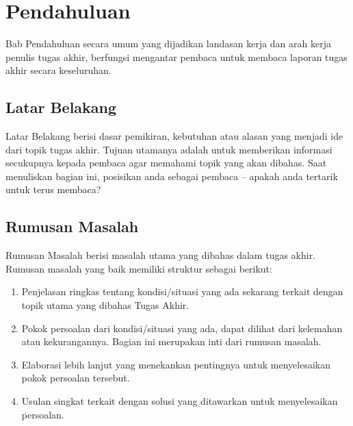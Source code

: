 %
%
%
%
%

\chapter{Pendahuluan}

Bab Pendahuluan secara umum yang dijadikan landasan kerja dan arah kerja penulis tugas akhir, berfungsi mengantar pembaca untuk membaca laporan tugas akhir secara keseluruhan.

\section{Latar Belakang}

Latar Belakang berisi dasar pemikiran, kebutuhan atau alasan yang menjadi ide dari topik tugas akhir. Tujuan utamanya adalah untuk memberikan informasi secukupnya kepada pembaca agar memahami topik yang akan dibahas.  Saat menuliskan bagian ini, posisikan anda sebagai pembaca – apakah anda tertarik untuk terus membaca?

\blindtext%

\section{Rumusan Masalah}

Rumusan Masalah berisi masalah utama yang dibahas dalam tugas akhir. Rumusan masalah yang baik memiliki struktur sebagai berikut:

\begin{enumerate}
    \item Penjelasan ringkas tentang kondisi/situasi yang ada sekarang terkait dengan topik utama yang dibahas Tugas Akhir.
    \item Pokok persoalan dari kondisi/situasi yang ada, dapat dilihat dari kelemahan atau kekurangannya. Bagian ini merupakan inti dari rumusan masalah.
    \item Elaborasi lebih lanjut yang menekankan pentingnya untuk menyelesaikan pokok persoalan tersebut.
    \item Usulan singkat terkait dengan solusi yang ditawarkan untuk menyelesaikan persoalan.
\end{enumerate}

